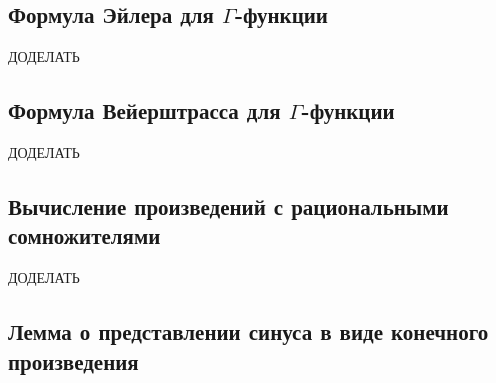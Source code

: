 \subsection{Формула Эйлера для \(\Gamma\)-функции}

ДОДЕЛАТЬ

\subsection{Формула Вейерштрасса для \(\Gamma\)-функции}

ДОДЕЛАТЬ

\subsection{Вычисление произведений с рациональными сомножителями}

ДОДЕЛАТЬ

\subsection{Лемма о представлении синуса в виде конечного произведения}

